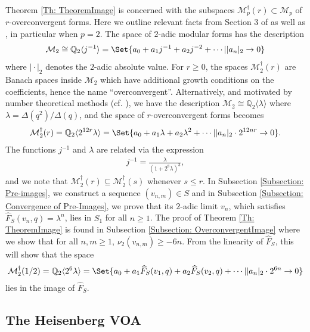 \documentclass[10pt,a4paper]{amsart}
\numberwithin{equation}{section}
\theoremstyle{definition}
\newcommand{\Heis}{S}
\newcommand{\twomodforms}{\mathcal{M}_{2}}
\newcommand{\pmodforms}{\mathcal{M}_{p}}
\newcommand{\poverconv}[1]{\pmodforms^{\dagger} (#1)}
\newcommand{\twooverconv}[1]{\twomodforms^{\dagger} (#1)}
\newcommand{\haupt}{\lambda}
\begin{document}
Theorem \ref{Th: TheoremImage} is concerned with the subspaces $\poverconv{r} \subset \pmodforms$ of $r$-overconvergent forms. Here we outline relevant facts from Section 3 of \cite{Vonk} as well as \cite{BC05}, in particular when $p=2$. The space of $2$-adic modular forms has the description 
\begin{align*}
    \twomodforms \cong \mathbb{Q}_{2}\langle j^{-1} \rangle = \Set{ a_{0} + a_{1}j^{-1} + a_{2}j^{-2} + \cdots | \vert a_{n} \vert_{2} \to 0}
\end{align*}
where $\vert \cdot \vert_{2}$ denotes the $2$-adic absolute value. For $r \geq 0$, the spaces $\twooverconv{r}$ are Banach spaces inside $\twomodforms$ which have additional growth conditions on the coefficients, hence the name ``overconvergent''. Alternatively, and motivated by number theoretical methods (cf. \cite{BC05,BKK05}), we have the description $\twomodforms \cong \mathbb{Q}_{2} \langle \haupt \rangle$ where $\haupt = \Delta (q^{2}) / \Delta (q)$, and the space of $r$-overconvergent forms becomes
\begin{align}
    \mathcal{M}_{2}^{\dagger}(r) = \mathbb{Q}_{2}\langle 2^{12r} \lambda \rangle = \Set{ a_{0} + a_{1}\haupt + a_{2}\haupt^{2} + \cdots | \vert a_{n} \vert_{2} \cdot 2^{12nr} \to 0 }.
\end{align}
The functions $j^{-1}$ and $\haupt$ are related via the expression
\begin{align*}
    j^{-1} = \frac{\haupt}{(1+2^{8}\haupt)^{3}},
\end{align*}
and we note that $\twooverconv{r} \subseteq \twooverconv{s}$ whenever $s \leq r$. In Subsection \ref{Subsection: Pre-images}, we construct a sequence $(v_{n,m}) \in \Heis$ and in Subsection \ref{Subsection: Convergence of Pre-Images}, we prove that its $2$-adic limit $v_{n}$, which satisfies $\widehat{F}_{\Heis}(v_{n},q) = \haupt^{n}$, lies in $S_{1}$ for all $n \geq 1$. The proof of Theorem \ref{Th: TheoremImage} is found in Subsection \ref{Subsection: OverconvergentImage} where we show that for all $n,m \geq 1$, $\nu_{2}(v_{n,m}) \geq -6n$. From the linearity of $\widehat{F}_{\Heis}$, this will show that the space
\begin{align*}
    \twooverconv{1/2} = \mathbb{Q}_{2} \langle 2^{6} \lambda \rangle = \Set{a_{0} + a_{1} \widehat{F}_{\Heis}(v_{1},q) + a_{2}\widehat{F}_{\Heis}(v_{2},q) + \cdots | \vert a_{n} \vert_{2} \cdot 2^{6n} \to 0}
\end{align*}
lies in the image of $\widehat{F}_{\Heis}$.


\subsection{The Heisenberg VOA}
\end{document}
